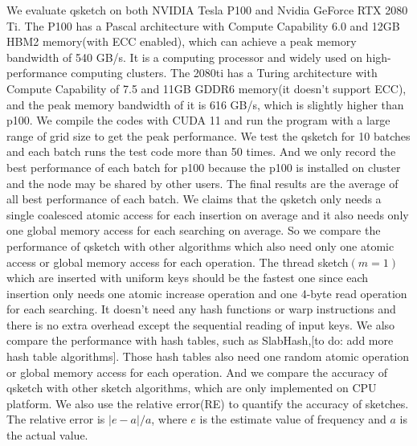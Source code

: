 \documentclass[conference]{IEEEtran}
\begin{document}



We evaluate qsketch on both NVIDIA Tesla P100 and Nvidia GeForce RTX 2080 Ti. 
The P100 has a Pascal architecture with Compute Capability 6.0 and 12GB HBM2 memory(with ECC enabled), which can achieve a peak memory bandwidth of 540 GB/s. It is a computing processor and widely used on high-performance computing clusters. The 2080ti has a Turing architecture with Compute Capability of 7.5 and 11GB GDDR6 memory(it doesn't support ECC), and the peak memory bandwidth of it is 616 GB/s, which is slightly higher than p100. We compile the codes with CUDA 11 and run the program with a large range of grid size to get the peak performance. We test the qsketch for 10 batches and each batch runs the test code more than 50 times. And we only record the best performance of each batch for p100 because the p100 is installed on cluster and the node may be shared by other users. The final results are the average of all best performance of each batch. We claims that the qsketch only needs a single coalesced atomic access for each insertion on average and it also needs only one global memory access for each searching on average. So we compare the performance of qsketch with other algorithms which also need only one atomic access or global memory access for each operation. The thread sketch$(m = 1)$ which are inserted with uniform keys should be the fastest one since each insertion only needs one atomic increase operation and one 4-byte read operation for each searching. It doesn't need any hash functions or warp instructions and there is no extra overhead except the sequential reading of input keys. We also compare the performance with hash tables, such as SlabHash,[to do: add more hash table algorithms]. Those hash tables also need one random atomic operation or global memory access for each operation. And we compare the accuracy of qsketch with other sketch algorithms, which are only implemented on CPU platform. We also use the relative error(RE) to quantify the accuracy of sketches\cite{b3}. The relative error is $\lvert e - a \rvert / a$, where $e$ is the estimate value of frequency and $a$ is the actual value.
\end{document}
